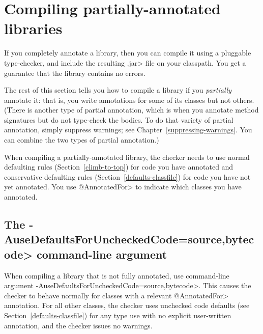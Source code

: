 \section{Compiling partially-annotated libraries\label{compiling-libraries}}

If you completely annotate a library, then you can compile it using a
pluggable type-checker, and include the resulting \<.jar> file on your
classpath.  You get a guarantee that the library contains no errors.

The rest of this section tells you how to compile a library if you
\emph{partially} annotate it:  that is, you write annotations for some of its
classes but not others.
(There is another type of partial annotation, which is when you annotate
method signatures but do not type-check the bodies.  To do that variety of
partial annotation, simply suppress warnings; see
Chapter~\ref{suppressing-warnings}.  You can combine the two types of
partial annotation.)

When compiling a partially-annotated library, the checker needs to use normal
defaulting rules (Section~\ref{climb-to-top}) for code you have annotated and
conservative defaulting rules (Section~\ref{defaults-classfile}) for
code you have not yet annotated.
You use \<@AnnotatedFor> to indicate which classes you have annotated.



\subsection{The \<-AuseDefaultsForUncheckedCode=source,bytecode> command-line
argument\label{AuseDefaultsForUncheckedCodesource}}

\begin{sloppypar}
When compiling a library that is not fully annotated, use command-line
argument \<-AuseDefaultsForUncheckedCode=source,bytecode>.  This causes
the checker to behave normally for classes with a relevant \<@AnnotatedFor>
annotation.  For all other classes, the checker uses unchecked code defaults
(see Section~\ref{defaults-classfile}) for any type use with no explicit
user-written annotation, and the checker issues no warnings.
\end{sloppypar}

